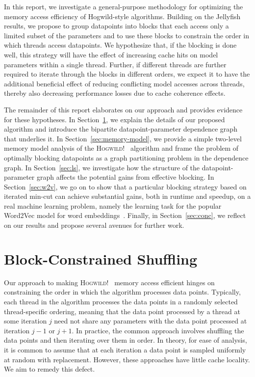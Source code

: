 \documentclass[times,11pt]{article}
\numberwithin{equation}{section}		%
\numberwithin{figure}{section}			%
\numberwithin{table}{section}				%
\newcommand{\HW}{\textsc{Hogwild!}}
\begin{document}
In this report, we investigate a general-purpose methodology for optimizing the memory access efficiency of Hogwild-style algorithms. Building on the Jellyfish results, we propose to group datapoints into blocks that each access only a 
limited subset of the parameters and to use these blocks to constrain the order in which threads access datapoints. We hypothesize that, if the blocking is done well, this strategy will have the effect of increasing cache hits on model parameters within a single thread.
Further, if different threads are further required to iterate through the blocks in different orders, we expect it to have the additional beneficial effect of reducing conflicting model accesses across threads, thereby also decreasing performance losses due to cache coherence effects.

The remainder of this report elaborates on our approach and provides evidence for these hypotheses. In Section~\ref{sec:alg-spec}, we explain the details of our proposed algorithm and introduce the bipartite datapoint-parameter dependence graph that underlies it. In Section~\ref{sec:memory-model}, we provide a simple 
two-level memory model analysis of the \HW~ algorithm and frame the problem of optimally blocking datapoints as a graph partitioning problem in the dependence graph. In Section~\ref{sec:ls}, we investigate how the structure of the datapoint-parameter graph affects the potential gains from 
effective blocking. In Section~\ref{sec:w2v}, we go on to show that a particular blocking strategy based on iterated min-cut can achieve substantial gains, both in runtime and speedup, on a real machine learning problem, namely the learning task for the popular Word2Vec model for word embeddings~\cite{arora2015rand}. Finally, in 
Section~\ref{sec:conc}, we reflect on our results and propose several avenues for further work.

\section{Block-Constrained Shuffling}\label{sec:alg-spec}

Our approach to making \HW~ memory access efficient hinges on constraining the order in which the algorithm processes data points. Typically, each thread
in the algorithm processes the data points in a randomly selected thread-specific ordering, meaning that the data
point processed by a thread at some iteration $j$ need not share any parameters with the data point processed at iteration $j - 1$ or $j + 1$. In practice, the 
common approach involves shuffling the data points and then iterating over them in order. In theory, for ease of analysis, it is common to assume that at each iteration
a data point is sampled uniformly at random with replacement. 
However, these approaches have little cache locality. We aim to remedy this defect.
\end{document}
